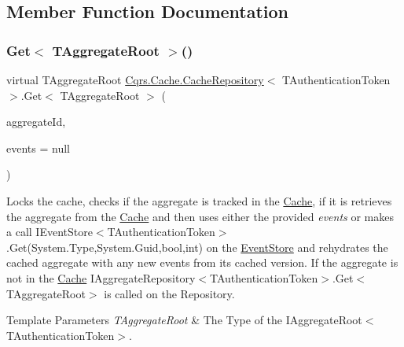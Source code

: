 \subsection{Member Function Documentation}
\mbox{\label{classCqrs_1_1Cache_1_1CacheRepository_a037acba636aedf23ff376ac0b749ec0c_a037acba636aedf23ff376ac0b749ec0c}} 
\subsubsection{\texorpdfstring{Get$<$ T\+Aggregate\+Root $>$()}{Get< TAggregateRoot >()}}
{\footnotesize\ttfamily virtual T\+Aggregate\+Root \hyperlink{classCqrs_1_1Cache_1_1CacheRepository}{Cqrs.\+Cache.\+Cache\+Repository}$<$ T\+Authentication\+Token $>$.Get$<$ T\+Aggregate\+Root $>$ (\begin{DoxyParamCaption}\item[{Guid}]{aggregate\+Id,  }\item[{I\+List$<$ \hyperlink{interfaceCqrs_1_1Events_1_1IEvent}{I\+Event}$<$ T\+Authentication\+Token $>$$>$}]{events = {\ttfamily null} }\end{DoxyParamCaption})\hspace{0.3cm}{\ttfamily [virtual]}}



Locks the cache, checks if the aggregate is tracked in the \hyperlink{namespaceCqrs_1_1Cache}{Cache}, if it is retrieves the aggregate from the \hyperlink{namespaceCqrs_1_1Cache}{Cache} and then uses either the provided {\itshape events}  or makes a call I\+Event\+Store$<$\+T\+Authentication\+Token$>$.\+Get(\+System.\+Type,\+System.\+Guid,bool,int) on the \hyperlink{namespaceCqrs_1_1EventStore}{Event\+Store} and rehydrates the cached aggregate with any new events from it\textquotesingle{}s cached version. If the aggregate is not in the \hyperlink{namespaceCqrs_1_1Cache}{Cache} I\+Aggregate\+Repository$<$\+T\+Authentication\+Token$>$.\+Get$<$\+T\+Aggregate\+Root$>$ is called on the Repository. 


\begin{DoxyTemplParams}{Template Parameters}
{\em T\+Aggregate\+Root} & The Type of the I\+Aggregate\+Root$<$\+T\+Authentication\+Token$>$.\\
\hline
\end{DoxyTemplParams}

